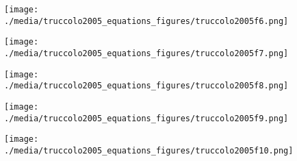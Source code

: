 \documentclass[svgnames,13pt]{beamer}
\begin{document}
\begin{frame}{}
\begin{figure}\centering\texttt{[image: ./media/truccolo2005\_equations\_figures/truccolo2005f6.png]}\\\end{figure}
\end{frame} 

\begin{frame}{}
\begin{figure}\centering\texttt{[image: ./media/truccolo2005\_equations\_figures/truccolo2005f7.png]}\\\end{figure}
\end{frame} 

\begin{frame}{}
\begin{figure}\centering\texttt{[image: ./media/truccolo2005\_equations\_figures/truccolo2005f8.png]}\\\end{figure}
\end{frame} 

\begin{frame}{}
\begin{figure}\centering\texttt{[image: ./media/truccolo2005\_equations\_figures/truccolo2005f9.png]}\\\end{figure}
\end{frame} 

\begin{frame}{}
\begin{figure}\centering\texttt{[image: ./media/truccolo2005\_equations\_figures/truccolo2005f10.png]}\\\end{figure}
\end{frame} 
\end{document}
